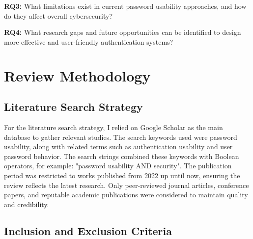 \documentclass[12pt,a4paper]{article}
\begin{document}
\begin{justify}
\vspace{0.2cm}

\textbf{RQ3:} What limitations exist in current password usability approaches, and how do they affect overall cybersecurity? 

\vspace{0.2cm}

\textbf{RQ4:} What research gaps and future opportunities can be identified to design more effective and user-friendly authentication systems? 



\section{Review Methodology}



\subsection{Literature Search Strategy}

For the literature search strategy, I relied on Google Scholar as the main database to gather relevant studies. The search keywords used were password usability, along with related terms such as authentication usability and user password behavior. 
The search strings combined these keywords with Boolean operators, for example: "password usability AND security". 
The publication period was restricted to works published from 2022 up until now, ensuring the review reflects the latest research. 
Only peer‑reviewed journal articles, conference papers, and reputable academic publications were considered to maintain quality and credibility.


\subsection{Inclusion and Exclusion Criteria}

\end{justify}

\end{document}
